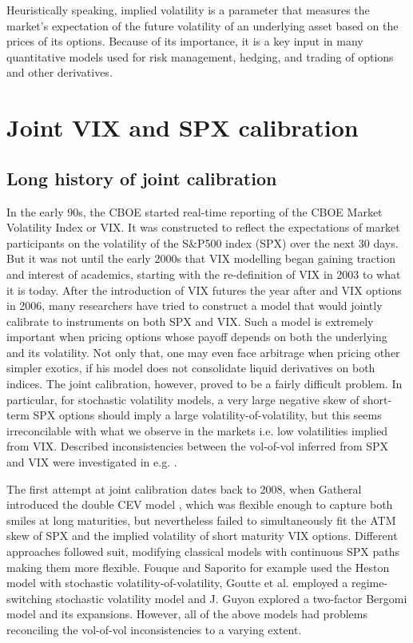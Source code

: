 Heuristically speaking, implied volatility is a parameter that measures the market's expectation of the future volatility of an underlying asset based on the prices of its options. Because of its importance, it is a key input in many quantitative models used for risk management, hedging, and trading of options and other derivatives.

\section{Joint VIX and SPX calibration}\label{sec:SPXnVIXintro}

\subsection{Long history of joint calibration}

In the early 90s, the CBOE started real-time reporting of the CBOE Market Volatility Index or VIX. It was constructed to reflect the expectations of market participants on the volatility of the S\&P500 index (SPX) over the next 30 days. But it was not until the early 2000s that VIX modelling began gaining traction and interest of academics, starting with the re-definition of VIX in 2003 to what it is today. After the introduction of VIX futures the year after and VIX options in 2006, many researchers have tried to construct a model that would jointly calibrate to instruments on both SPX and VIX. Such a model is extremely important when pricing options whose payoff depends on both the underlying and its volatility. Not only that, one may even face arbitrage when pricing other simpler exotics, if his model does not consolidate liquid derivatives on both indices. The joint calibration, however, proved to be a fairly difficult problem. In particular, for stochastic volatility models, a very large negative skew of short-term SPX options should imply a large volatility-of-volatility, but this seems irreconcilable with what we observe in the markets i.e. low volatilities implied from VIX. Described inconsistencies between the vol-of-vol inferred from SPX and VIX were investigated in e.g. \cite{Song2012APrices, Jacquier2021RoughOptions}.

The first attempt at joint calibration dates back to 2008, when Gatheral introduced the double CEV model \cite{Gatheral2008ConsistentOptions}, which was flexible enough to capture both smiles at long maturities, but nevertheless failed to simultaneously fit the ATM skew of SPX and the implied volatility of short maturity VIX options. Different approaches followed suit, modifying classical models with continuous SPX paths making them more flexible. %
Fouque and Saporito \cite{Fouque2018HestonOptions} for example used the Heston model with stochastic volatility-of-volatility, Goutte et al. \cite{Goutte2017Regime-switchingOptions} employed a regime-switching stochastic volatility model and J. Guyon \cite{Guyon2017OnOptions, Guyon2022TheSkew} explored a two-factor Bergomi model and its expansions. However, all of the above models had problems reconciling the vol-of-vol inconsistencies to a varying extent.

